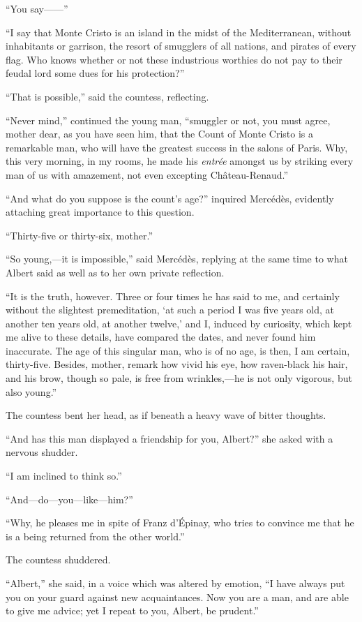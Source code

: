“You say——”

“I say that Monte Cristo is an island in the midst of the
Mediterranean, without inhabitants or garrison, the resort of smugglers
of all nations, and pirates of every flag. Who knows whether or not
these industrious worthies do not pay to their feudal lord some dues
for his protection?”

“That is possible,” said the countess, reflecting.

“Never mind,” continued the young man, “smuggler or not, you must
agree, mother dear, as you have seen him, that the Count of Monte
Cristo is a remarkable man, who will have the greatest success in the
salons of Paris. Why, this very morning, in my rooms, he made his
\textit{entrée} amongst us by striking every man of us with amazement, not
even excepting Château-Renaud.”

“And what do you suppose is the count’s age?” inquired Mercédès,
evidently attaching great importance to this question.

“Thirty-five or thirty-six, mother.”

“So young,—it is impossible,” said Mercédès, replying at the same time
to what Albert said as well as to her own private reflection.

“It is the truth, however. Three or four times he has said to me, and
certainly without the slightest premeditation, ‘at such a period I was
five years old, at another ten years old, at another twelve,’ and I,
induced by curiosity, which kept me alive to these details, have
compared the dates, and never found him inaccurate. The age of this
singular man, who is of no age, is then, I am certain, thirty-five.
Besides, mother, remark how vivid his eye, how raven-black his hair,
and his brow, though so pale, is free from wrinkles,—he is not only
vigorous, but also young.”

The countess bent her head, as if beneath a heavy wave of bitter
thoughts.

“And has this man displayed a friendship for you, Albert?” she asked
with a nervous shudder.

“I am inclined to think so.”

“And—do—you—like—him?”

“Why, he pleases me in spite of Franz d’Épinay, who tries to convince
me that he is a being returned from the other world.”

The countess shuddered.

“Albert,” she said, in a voice which was altered by emotion, “I have
always put you on your guard against new acquaintances. Now you are a
man, and are able to give me advice; yet I repeat to you, Albert, be
prudent.”

